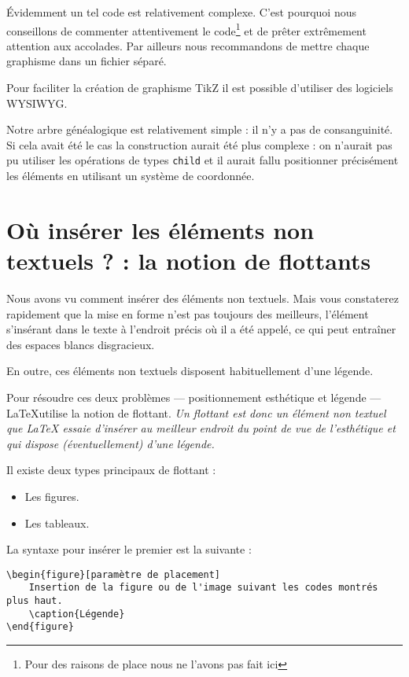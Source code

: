 Évidemment un tel code est relativement complexe. C'est pourquoi nous conseillons de commenter attentivement le code\footnote{Pour des raisons de place nous ne l'avons pas fait ici} et de prêter extrêmement attention  aux accolades. Par ailleurs nous recommandons de mettre chaque graphisme  dans un fichier séparé.

Pour faciliter la création de graphisme TikZ il est possible d'utiliser des logiciels WYSIWYG.

Notre arbre généalogique est relativement simple : il n'y a pas de consanguinité. Si cela avait été le cas la construction aurait été plus complexe : on n'aurait pas pu utiliser les opérations de types \verb|child| et il aurait fallu positionner précisément les éléments en utilisant un système de coordonnée.



\section[La notion de flottants]{Où insérer les éléments non textuels ? : la notion de flottants}
\label{legende}
Nous avons vu comment insérer des éléments non textuels. Mais vous constaterez rapidement que la mise en forme n'est pas toujours des meilleurs, l'élément s'insérant dans le texte à l'endroit précis où il a été appelé, ce qui peut entraîner des espaces blancs disgracieux.

En outre, ces éléments non textuels disposent habituellement d'une légende.

Pour résoudre ces deux problèmes --- positionnement esthétique et légende --- \LaTeX utilise la notion de flottant. \emph{Un flottant est donc un élément non textuel que LaTeX essaie d'insérer au meilleur endroit du point de vue de l'esthétique et qui dispose (éventuellement) d'une légende.}

Il existe deux types principaux de flottant :
\begin{itemize}
	\item Les figures.
	\item Les tableaux.
\end{itemize}

La syntaxe pour insérer le premier est la suivante :

\begin{verbatim}
\begin{figure}[paramètre de placement]
	Insertion de la figure ou de l'image suivant les codes montrés plus haut.
	\caption{Légende}
\end{figure} 
\end{verbatim}

